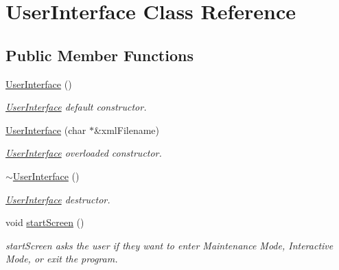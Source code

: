 \hypertarget{class_user_interface}{\section{User\-Interface Class Reference}
\label{class_user_interface}
}
\subsection*{Public Member Functions}
\begin{DoxyCompactItemize}
\item 
\hypertarget{class_user_interface_ae6fb70370701b3bd6120e923df9705b0}{\hyperlink{class_user_interface_ae6fb70370701b3bd6120e923df9705b0}{User\-Interface} ()}\label{class_user_interface_ae6fb70370701b3bd6120e923df9705b0}

\begin{DoxyCompactList}\small\item\em \hyperlink{class_user_interface}{User\-Interface} default constructor. \end{DoxyCompactList}\item 
\hyperlink{class_user_interface_a2d478bf174c5a898320fbdd05de75a71}{User\-Interface} (char $\ast$\&xml\-Filename)
\begin{DoxyCompactList}\small\item\em \hyperlink{class_user_interface}{User\-Interface} overloaded constructor. \end{DoxyCompactList}\item 
\hypertarget{class_user_interface_ae588b2ff1711a016dd4c6fc5002c0841}{\hyperlink{class_user_interface_ae588b2ff1711a016dd4c6fc5002c0841}{$\sim$\-User\-Interface} ()}\label{class_user_interface_ae588b2ff1711a016dd4c6fc5002c0841}

\begin{DoxyCompactList}\small\item\em \hyperlink{class_user_interface}{User\-Interface} destructor. \end{DoxyCompactList}\item 
\hypertarget{class_user_interface_af0a5c73ee606a90f23f2c733b3b13415}{void \hyperlink{class_user_interface_af0a5c73ee606a90f23f2c733b3b13415}{start\-Screen} ()}\label{class_user_interface_af0a5c73ee606a90f23f2c733b3b13415}

\begin{DoxyCompactList}\small\item\em start\-Screen asks the user if they want to enter Maintenance Mode, Interactive Mode, or exit the program. \end{DoxyCompactList}\end{DoxyCompactItemize}


